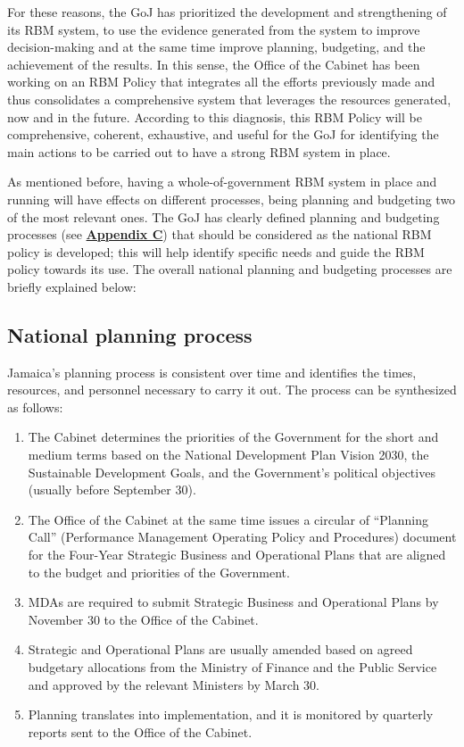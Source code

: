 \documentclass[
  10pt,
]{book}
\begin{document}
For these reasons, the GoJ has prioritized the development and strengthening of its RBM system, to use the evidence generated from the system to improve decision-making and at the same time improve planning, budgeting, and the achievement of the results. In this sense, the Office of the Cabinet has been working on an RBM Policy that integrates all the efforts previously made and thus consolidates a comprehensive system that leverages the resources generated, now and in the future. According to this diagnosis, this RBM Policy will be comprehensive, coherent, exhaustive, and useful for the GoJ for identifying the main actions to be carried out to have a strong RBM system in place.

As mentioned before, having a whole-of-government RBM system in place and running will have effects on different processes, being planning and budgeting two of the most relevant ones. The GoJ has clearly defined planning and budgeting processes (see \protect\hyperlink{appendixC}{\textbf{Appendix C}}) that should be considered as the national RBM policy is developed; this will help identify specific needs and guide the RBM policy towards its use. The overall national planning and budgeting processes are briefly explained below:

\hypertarget{national-planning-process}{%
\subsection{National planning process}\label{national-planning-process}}

Jamaica's planning process is consistent over time and identifies the times, resources, and personnel necessary to carry it out. The process can be synthesized as follows:

\begin{enumerate}
\def\labelenumi{\arabic{enumi}.}
\item
  The Cabinet determines the priorities of the Government for the short and medium terms based on the National Development Plan Vision 2030, the Sustainable Development Goals, and the Government's political objectives (usually before September 30).
\item
  The Office of the Cabinet at the same time issues a circular of ``Planning Call'' (Performance Management Operating Policy and Procedures) document for the Four-Year Strategic Business and Operational Plans that are aligned to the budget and priorities of the Government.
\item
  MDAs are required to submit Strategic Business and Operational Plans by November 30 to the Office of the Cabinet.
\item
  Strategic and Operational Plans are usually amended based on agreed budgetary allocations from the Ministry of Finance and the Public Service and approved by the relevant Ministers by March 30.
\item
  Planning translates into implementation, and it is monitored by quarterly reports sent to the Office of the Cabinet.
\end{enumerate}
\end{document}
